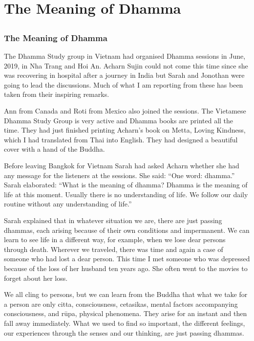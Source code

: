 \part{The Meaning of Dhamma}

\chapter[The Meaning of Dhamma]{}
\section*{The Meaning of Dhamma}

The Dhamma Study group in Vietnam had organised Dhamma
sessions in June, 2019, in Nha Trang and Hoi An.
Acharn Sujin could not come this time
since she was recovering in hospital after a journey in
India but Sarah and Jonothan were going to lead the
discussions. Much of what I am reporting from these has been taken from
their inspiring remarks. 

Ann from Canada and Roti from Mexico also joined the sessions. The
Vietamese Dhamma Study Group is very active and Dhamma books are printed
all the time. They had just finished printing Acharn's book on Metta,
Loving Kindness, which I had translated from Thai into English. They had
designed a beautiful cover with a hand of the Buddha. 

Before leaving Bangkok for Vietnam Sarah had asked Acharn
whether she had any message for the listeners at the sessions. She said:
``One word: dhamma.'' Sarah elaborated: ``What is the meaning of dhamma?
Dhamma is the meaning of life at this moment. Usually there is no
understanding of life. We follow our daily routine without any
understanding of life.'' 

Sarah explained that in whatever situation we are, there are
just passing dhammas, each arising because of their own conditions and
impermanent. We can learn to see life in a different way, for example,
when we lose dear persons through death. Wherever we traveled, there was
time and again a case of someone who had lost a dear person. This time I
met someone who was depressed because of the loss of her husband ten
years ago. She often went to
the movies to forget about her loss. 

We all cling to persons, but we can learn from the Buddha
that what we take for a person are only citta, consciousness, cetasikas,
mental factors accompanying consciousness, and rūpa, physical
phenomena. They arise for an instant and then fall away immediately.
What we used to find so important, the different feelings, our
experiences through the senses and our thinking, are just passing
dhammas. 

